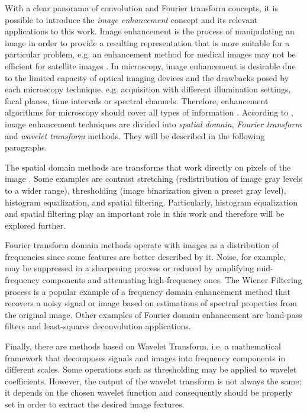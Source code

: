 With a clear panorama of convolution and Fourier transform concepts, it is possible to introduce the \emph{image enhancement} concept and its relevant applications to this work. Image enhancement is the process of manipulating an image in order to provide a resulting representation that is more suitable for a particular problem, e.g. an enhancement method for medical images may not be efficient for satellite images \cite{gonzalez2018digital}. In microscopy, image enhancement is desirable due to the limited capacity of optical imaging devices and the drawbacks posed by each microscopy technique, e.g. acquisition with different illumination settings, focal planes, time intervals or spectral channels. Therefore, enhancement algorithms for microscopy should cover all types of information \cite{wu2008microscope}. According to , image enhancement techniques are divided into \emph{spatial domain}, \emph{Fourier transform} and \emph{wavelet transform} methods. They will be described in the following paragraphs. 

The spatial domain methods are transforms that work directly on pixels of the image \cite{gonzalez2018digital}. Some examples are contrast stretching (redistribution of image gray levels to a wider range), thresholding (image binarization given a preset gray level), histogram equalization, and spatial filtering. Particularly, histogram equalization and spatial filtering play an important role in this work and therefore will be explored further.

Fourier transform domain methods operate with images as a distribution of frequencies since some features are better described by it. Noise, for example, may be suppressed in a sharpening process or reduced by amplifying mid-frequency components and attenuating high-frequency ones. The Wiener Filtering process is a popular example of a frequency domain enhancement method that recovers a noisy signal or image based on estimations of spectral properties from the original image. Other examples of Fourier domain enhancement are band-pass filters and least-squares deconvolution applications. 

Finally, there are methods based on Wavelet Transform, i.e. a mathematical framework that decomposes signals and images into frequency components in different scales. Some operations such as thresholding may be applied to wavelet coefficients. However, the output of the wavelet transform is not always the same; it depends on the chosen wavelet function and consequently should be properly set in order to extract the desired image features.

